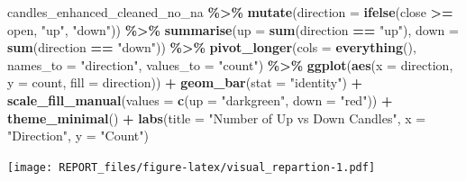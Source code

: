 \documentclass[
]{article}
\newenvironment{Shaded}{\begin{snugshade}}{\end{snugshade}}
\newcommand{\AttributeTok}[1]{\textcolor[rgb]{0.13,0.29,0.53}{#1}}
\newcommand{\FunctionTok}[1]{\textcolor[rgb]{0.13,0.29,0.53}{\textbf{#1}}}
\newcommand{\NormalTok}[1]{#1}
\newcommand{\SpecialCharTok}[1]{\textcolor[rgb]{0.81,0.36,0.00}{\textbf{#1}}}
\newcommand{\StringTok}[1]{\textcolor[rgb]{0.31,0.60,0.02}{#1}}
\begin{document}
\begin{Shaded}
\begin{Highlighting}[]
\NormalTok{candles\_enhanced\_cleaned\_no\_na }\SpecialCharTok{\%\textgreater{}\%}
    \FunctionTok{mutate}\NormalTok{(}\AttributeTok{direction =} \FunctionTok{ifelse}\NormalTok{(close }\SpecialCharTok{\textgreater{}=}\NormalTok{ open, }\StringTok{"up"}\NormalTok{, }\StringTok{"down"}\NormalTok{)) }\SpecialCharTok{\%\textgreater{}\%}
    \FunctionTok{summarise}\NormalTok{(}\AttributeTok{up =} \FunctionTok{sum}\NormalTok{(direction }\SpecialCharTok{==} \StringTok{"up"}\NormalTok{), }\AttributeTok{down =} \FunctionTok{sum}\NormalTok{(direction }\SpecialCharTok{==}
        \StringTok{"down"}\NormalTok{)) }\SpecialCharTok{\%\textgreater{}\%}
    \FunctionTok{pivot\_longer}\NormalTok{(}\AttributeTok{cols =} \FunctionTok{everything}\NormalTok{(), }\AttributeTok{names\_to =} \StringTok{"direction"}\NormalTok{,}
        \AttributeTok{values\_to =} \StringTok{"count"}\NormalTok{) }\SpecialCharTok{\%\textgreater{}\%}
    \FunctionTok{ggplot}\NormalTok{(}\FunctionTok{aes}\NormalTok{(}\AttributeTok{x =}\NormalTok{ direction, }\AttributeTok{y =}\NormalTok{ count, }\AttributeTok{fill =}\NormalTok{ direction)) }\SpecialCharTok{+}
    \FunctionTok{geom\_bar}\NormalTok{(}\AttributeTok{stat =} \StringTok{"identity"}\NormalTok{) }\SpecialCharTok{+} \FunctionTok{scale\_fill\_manual}\NormalTok{(}\AttributeTok{values =} \FunctionTok{c}\NormalTok{(}\AttributeTok{up =} \StringTok{"darkgreen"}\NormalTok{,}
    \AttributeTok{down =} \StringTok{"red"}\NormalTok{)) }\SpecialCharTok{+} \FunctionTok{theme\_minimal}\NormalTok{() }\SpecialCharTok{+} \FunctionTok{labs}\NormalTok{(}\AttributeTok{title =} \StringTok{"Number of Up vs Down Candles"}\NormalTok{,}
    \AttributeTok{x =} \StringTok{"Direction"}\NormalTok{, }\AttributeTok{y =} \StringTok{"Count"}\NormalTok{)}
\end{Highlighting}
\end{Shaded}

\texttt{[image: REPORT\_files/figure-latex/visual\_repartion-1.pdf]}
\end{document}
